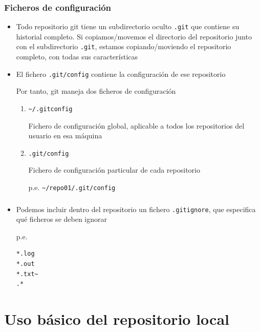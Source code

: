 \documentclass[ucs]{beamer}
\begin{document}
\begin{frame}[fragile]
\frametitle{Ficheros de configuración}
\begin{itemize}
\item
Todo repositorio git tiene un subdirectorio oculto \verb|.git|
que contiene su historial completo. Si copiamos/movemos
el directorio del repositorio junto con el subdirectorio
\verb|.git|, estamos copiando/moviendo el repositorio
completo, con todas sus características
\item
El fichero \verb|.git/config| contiene la configuración de
ese repositorio

Por tanto, git maneja dos ficheros de configuración

\begin{enumerate}
\item
\verb|~/.gitconfig|

Fichero de configuración global, aplicable a todos los repositorios del 
usuario en esa máquina
\item
\verb|.git/config|

Fichero de configuración particular de cada repositorio

p.e. \verb|~/repo01/.git/config|
\end{enumerate}
\end{itemize}

\end{frame}


\begin{frame}[fragile]
\frametitle{}
\begin{itemize}
\item
Podemos incluir dentro del repositorio un fichero \verb|.gitignore|, que especifica
qué ficheros se deben ignorar

p.e.

  \begin{footnotesize}
  \begin{verbatim}
*.log
*.out
*.txt~
.*
  \end{verbatim}
  \end{footnotesize}
\end{itemize}

\end{frame}


\section{Uso básico del repositorio local}
\end{document}
